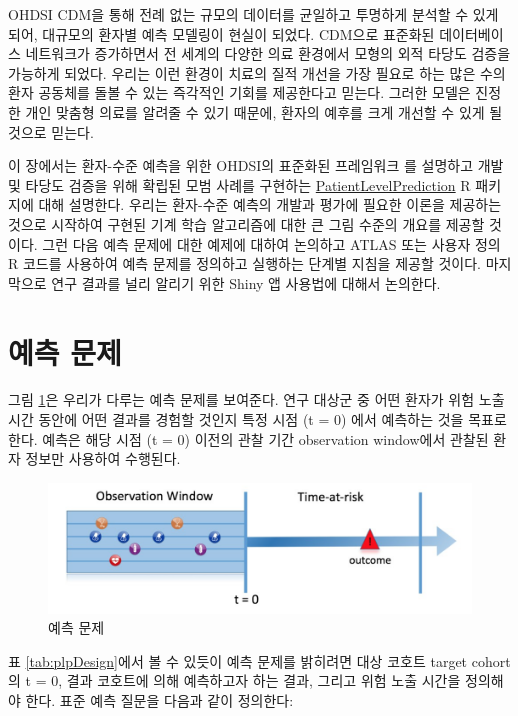 \documentclass[11pt]{book}
\theoremstyle{definition}
\theoremstyle{definition}
\theoremstyle{definition}
\theoremstyle{remark}
\begin{document}
OHDSI CDM을 통해 전례 없는 규모의 데이터를 균일하고 투명하게 분석할 수
있게 되어, 대규모의 환자별 예측 모델링이 현실이 되었다. CDM으로 표준화된
데이터베이스 네트워크가 증가하면서 전 세계의 다양한 의료 환경에서 모형의
외적 타당도 검증을 가능하게 되었다. 우리는 이런 환경이 치료의 질적
개선을 가장 필요로 하는 많은 수의 환자 공동체를 돌볼 수 있는 즉각적인
기회를 제공한다고 믿는다. 그러한 모델은 진정한 개인 맞춤형 의료를 알려줄
수 있기 때문에, 환자의 예후를 크게 개선할 수 있게 될 것으로 믿는다.

이 장에서는 환자-수준 예측을 위한 OHDSI의 표준화된 프레임워크
\citep{reps2018} 를 설명하고 개발 및 타당도 검증을 위해 확립된 모범
사례를 구현하는
\href{https://ohdsi.github.io/PatientLevelPrediction/}{PatientLevelPrediction}
R 패키지에 대해 설명한다. 우리는 환자-수준 예측의 개발과 평가에 필요한
이론을 제공하는 것으로 시작하여 구현된 기계 학습 알고리즘에 대한 큰 그림
수준의 개요를 제공할 것이다. 그런 다음 예측 문제에 대한 예제에 대하여
논의하고 ATLAS 또는 사용자 정의 R 코드를 사용하여 예측 문제를 정의하고
실행하는 단계별 지침을 제공할 것이다. 마지막으로 연구 결과를 널리 알리기
위한 Shiny 앱 사용법에 대해서 논의한다.

\section{예측 문제}\label{-}

그림 \ref{fig:figure1}은 우리가 다루는 예측 문제를 보여준다. 연구 대상군
중 어떤 환자가 위험 노출 시간 동안에 어떤 결과를 경험할 것인지 특정 시점
(t = 0) 에서 예측하는 것을 목표로 한다. 예측은 해당 시점 (t = 0) 이전의
관찰 기간 observation window에서 관찰된 환자 정보만 사용하여 수행된다.

\begin{figure}

{\centering \includegraphics[width=1\linewidth]{images/PatientLevelPrediction/Figure1} 

}

\caption{예측 문제}\label{fig:figure1}
\end{figure}

표 \ref{tab:plpDesign}에서 볼 수 있듯이 예측 문제를 밝히려면 대상 코호트
target cohort의 t = 0, 결과 코호트에 의해 예측하고자 하는 결과, 그리고
위험 노출 시간을 정의해야 한다. 표준 예측 질문을 다음과 같이 정의한다:
  
\end{document}
